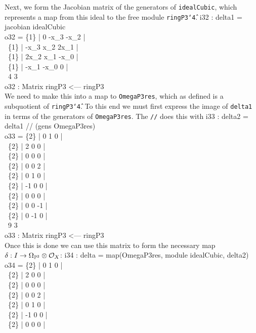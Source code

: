 Next, we form the Jacobian matrix of the generators
of
{\tt idealCubic}, which represents a map
from this ideal to the free module {\tt ringP3\char`\^4}.
\beginOutput
i32 : delta1 = jacobian idealCubic\\
\emptyLine
o32 = \{1\} | 0    -x_3 -x_2 |\\
\      \{1\} | -x_3 x_2  2x_1 |\\
\      \{1\} | 2x_2 x_1  -x_0 |\\
\      \{1\} | -x_1 -x_0 0    |\\
\emptyLine
\                   4            3\\
o32 : Matrix ringP3  <--- ringP3\\
\endOutput
We need to make this into a map to {\tt OmegaP3res}, which
as defined is a subquotient of {\tt ringP3\char`\^4}. To this end
we must first express the image of {\tt delta1} in terms of
the generators of {\tt OmegaP3res}. The  {\tt //}
does this with
\beginOutput
i33 : delta2 = delta1 // (gens OmegaP3res)\\
\emptyLine
o33 = \{2\} | 0  1  0  |\\
\      \{2\} | 2  0  0  |\\
\      \{2\} | 0  0  0  |\\
\      \{2\} | 0  0  2  |\\
\      \{2\} | 0  1  0  |\\
\      \{2\} | -1 0  0  |\\
\      \{2\} | 0  0  0  |\\
\      \{2\} | 0  0  -1 |\\
\      \{2\} | 0  -1 0  |\\
\emptyLine
\                   9            3\\
o33 : Matrix ringP3  <--- ringP3\\
\endOutput
Once this is done we can use this matrix to form the
necessary map $\delta: I\to \Omega_{{\mathbb P}^3}\otimes{\cal O}_X$:
\beginOutput
i34 : delta = map(OmegaP3res, module idealCubic, delta2)\\
\emptyLine
o34 = \{2\} | 0  1  0  |\\
\      \{2\} | 2  0  0  |\\
\      \{2\} | 0  0  0  |\\
\      \{2\} | 0  0  2  |\\
\      \{2\} | 0  1  0  |\\
\      \{2\} | -1 0  0  |\\
\      \{2\} | 0  0  0  |\\
